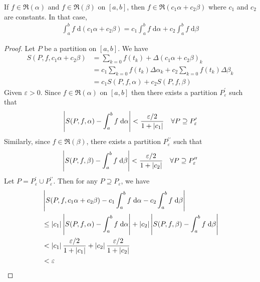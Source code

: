 \documentclass[thmcnt=section, 12pt]{my-elegantbook}
\begin{document}
\begin{theorem} \label{thm:19}
    If $f \in \mathfrak{R}(\alpha)$ and $f \in \mathfrak{R}(\beta)$ on $[a,b]$, then $f \in \mathfrak{R}(c_1 \alpha + c_2 \beta)$ where $c_1$ and $c_2$ are constants. In that case, 
    \begin{align*}
        \int_a^b f \; \mathrm{d}(c_1 \alpha + c_2 \beta)
        = c_1 \int_a^b f \; \mathrm{d}\alpha
        + c_2 \int_a^b f \; \mathrm{d}\beta
    \end{align*}
\end{theorem}

\begin{proof}
    Let $P$ be a partition on $[a,b]$. We have 
    \begin{align*}
        S(P, f, c_1 \alpha + c_2 \beta)
        &= \sum_{k=0} f(t_k) + \Delta(c_1 \alpha + c_2 \beta)_k \\ 
        &= c_1 \sum_{k=0} f(t_k) \Delta\alpha_k
        + c_2 \sum_{k=0} f(t_k) \Delta\beta_k \\ 
        &= c_1 S(P, f, \alpha) + c_2 S(P, f, \beta)
    \end{align*}
    Given $\varepsilon > 0$. Since $f \in \mathfrak{R}(\alpha)$ on $[a,b]$ then there exists a partition $P_\varepsilon^{\prime}$
    such that 
    \begin{align*}
        \left\lvert S(P, f, \alpha) - \int_a^b f \; \mathrm{d}\alpha \right\rvert < \frac{\varepsilon / 2}{1 + \left\lvert c_1 \right\rvert}
        \quad \forall P \supseteq P_\varepsilon^{\prime}
    \end{align*}
    Similarly, since $f \in \mathfrak{R}(\beta)$, there exists a partition $P_\varepsilon^{\prime\prime}$ such that 
    \begin{align*}
        \left\lvert S(P, f, \beta) - \int_a^b f \; \mathrm{d}\beta \right\rvert < \frac{\varepsilon / 2}{1 + \left\lvert c_2 \right\rvert}
        \quad \forall P \supseteq P_\varepsilon^{\prime\prime}
    \end{align*}
    Let $P = P_\varepsilon^{\prime} \cup P_\varepsilon^{\prime\prime}$. Then for any $P \supseteq P_\varepsilon$, we have 
    \begin{align*}
        &\left\lvert 
            S(P, f, c_1 \alpha + c_2 \beta) 
            - c_1 \int_a^b f \; \mathrm{d}\alpha
            - c_2 \int_a^b f \; \mathrm{d}\beta
         \right\rvert \\
        &\leq \left\lvert c_1 \right\rvert \left\lvert S(P,f,\alpha) - \int_a^b f \; \mathrm{d}\alpha \right\rvert
        + \left\lvert c_2 \right\rvert \left\lvert S(P,f,\beta) - \int_a^b f \; \mathrm{d}\beta \right\rvert \\ 
        &< \left\lvert c_1 \right\rvert \frac{\varepsilon / 2}{1 + \left\lvert c_1 \right\rvert}
        + \left\lvert c_2 \right\rvert \frac{\varepsilon / 2}{1 + \left\lvert c_2 \right\rvert} \\ 
        &< \varepsilon
    \end{align*}
\end{proof}
\end{document}
